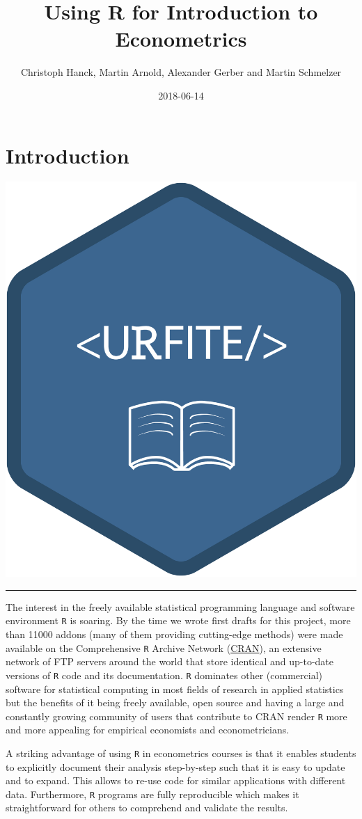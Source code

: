 \documentclass[]{book}
\title{Using R for Introduction to Econometrics}
\author{Christoph Hanck, Martin Arnold, Alexander Gerber and Martin Schmelzer}
\date{2018-06-14}
\theoremstyle{definition}
\theoremstyle{definition}
\theoremstyle{definition}
\theoremstyle{remark}
\begin{document}
\maketitle

{
\setcounter{tocdepth}{1}
\tableofcontents
}
\chapter{Introduction}\label{introduction}

\begin{center}\includegraphics[width=0.45\linewidth]{images/URFITE_logo} \end{center}

\noindent\rule{\textwidth}{1pt}

The interest in the freely available statistical programming language
and software environment \texttt{R} is soaring. By the time we wrote
first drafts for this project, more than 11000 addons (many of them
providing cutting-edge methods) were made available on the Comprehensive
\texttt{R} Archive Network (\href{https://cran.r-project.org/}{CRAN}),
an extensive network of FTP servers around the world that store
identical and up-to-date versions of \texttt{R} code and its
documentation. \texttt{R} dominates other (commercial) software for
statistical computing in most fields of research in applied statistics
but the benefits of it being freely available, open source and having a
large and constantly growing community of users that contribute to CRAN
render \texttt{R} more and more appealing for empirical economists and
econometricians.

A striking advantage of using \texttt{R} in econometrics courses is that
it enables students to explicitly document their analysis step-by-step
such that it is easy to update and to expand. This allows to re-use code
for similar applications with different data. Furthermore, \texttt{R}
programs are fully reproducible which makes it straightforward for
others to comprehend and validate the results.
\end{document}
